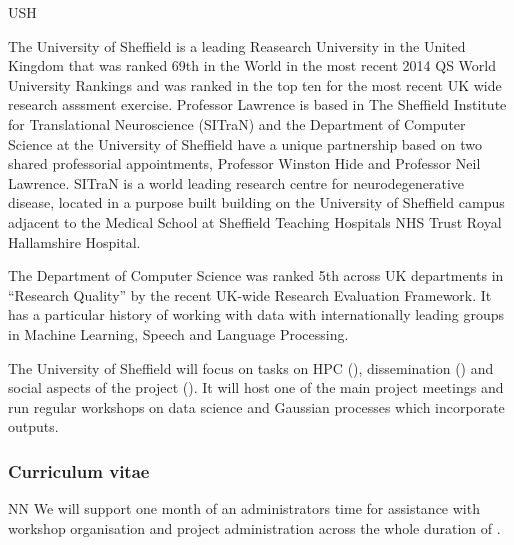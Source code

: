 \begin{sitedescription}{USH}



The University of Sheffield is a leading Reasearch University in the
United Kingdom that was ranked 69th in the World in the most recent
2014 QS World University Rankings and was ranked in the top ten for
the most recent UK wide research asssment exercise.  Professor
Lawrence is based in The Sheffield Institute for Translational
Neuroscience (SITraN) and the Department of Computer Science at the
University of Sheffield have a unique partnership based on two shared
professorial appointments, Professor Winston Hide and Professor Neil
Lawrence.  SITraN is a world leading research centre for
neurodegenerative disease, located in a purpose built building on the
University of Sheffield campus adjacent to the Medical School at
Sheffield Teaching Hospitals NHS Trust Royal Hallamshire Hospital. 

The Department of Computer Science was ranked 5th across UK
departments in ``Research Quality'' by the recent UK-wide Research
Evaluation Framework. It has a particular history of working with data
with internationally leading groups in Machine Learning, Speech and
Language Processing.

The University of Sheffield will focus on tasks on HPC (),
dissemination () and social aspects of the project
(). It will host one of the main project meetings
and run regular workshops on data science and Gaussian processes which incorporate
\TheProject outputs.

\subsubsection*{Curriculum vitae}






\begin{participant}[type=res,PM=1]{NN}
  We will support one month of an administrators time for assistance
  with workshop organisation and project administration across the
  whole duration of \TheProject.
\end{participant}



\end{sitedescription}
